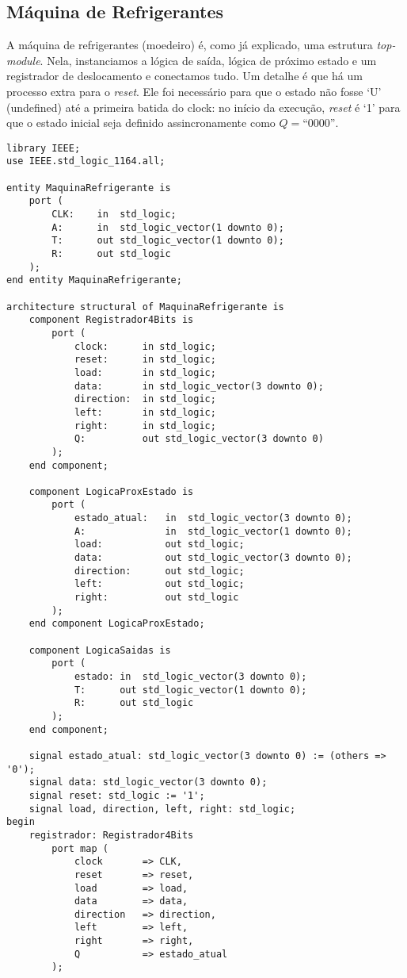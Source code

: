 \documentclass[a4paper,12pt]{article}
\newenvironment{code}{\captionsetup{type=listing}}{}
\begin{document}
\subsection{Máquina de Refrigerantes}
A máquina de refrigerantes (moedeiro) é, como já explicado, uma estrutura \textit{top-module}. Nela, instanciamos a lógica de saída, lógica de próximo estado e um registrador de deslocamento e conectamos tudo. Um detalhe é que há um processo extra para o \textit{reset}. Ele foi necessário para que o estado não fosse `U' (undefined) até a primeira batida do clock: no início da execução, \textit{reset} é `1' para que o estado inicial seja definido assincronamente como $Q =\text{``}0000\text{''}$.
\begin{code}
    \begin{verbatim}
library IEEE;
use IEEE.std_logic_1164.all;

entity MaquinaRefrigerante is
    port (
        CLK:    in  std_logic;
        A:      in  std_logic_vector(1 downto 0);
        T:      out std_logic_vector(1 downto 0);
        R:      out std_logic
    );
end entity MaquinaRefrigerante;

architecture structural of MaquinaRefrigerante is
    component Registrador4Bits is
        port (
            clock:      in std_logic;
            reset:      in std_logic;
            load:       in std_logic;
            data:       in std_logic_vector(3 downto 0);
            direction:  in std_logic;
            left:       in std_logic;
            right:      in std_logic;
            Q:          out std_logic_vector(3 downto 0)
        );
    end component;

    component LogicaProxEstado is
        port (
            estado_atual:   in  std_logic_vector(3 downto 0);
            A:              in  std_logic_vector(1 downto 0);
            load:           out std_logic;
            data:           out std_logic_vector(3 downto 0);
            direction:      out std_logic;
            left:           out std_logic;
            right:          out std_logic
        );
    end component LogicaProxEstado;

    component LogicaSaidas is
        port (
            estado: in  std_logic_vector(3 downto 0);
            T:      out std_logic_vector(1 downto 0);
            R:      out std_logic
        );
    end component;

    signal estado_atual: std_logic_vector(3 downto 0) := (others => '0');
    signal data: std_logic_vector(3 downto 0);
    signal reset: std_logic := '1';
    signal load, direction, left, right: std_logic;
begin
    registrador: Registrador4Bits
        port map (
            clock       => CLK,
            reset       => reset,
            load        => load,
            data        => data,
            direction   => direction,
            left        => left,
            right       => right,
            Q           => estado_atual
        );


\end{verbatim}
\end{code}
\end{document}
